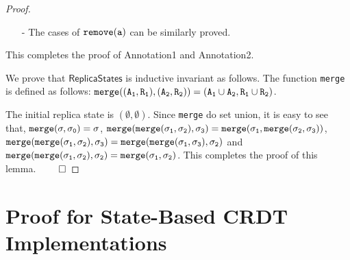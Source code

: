 \begin {proof}
\begin{itemize}
    \begin{itemize}
    \setlength{\itemsep}{0.5pt}
    \item[-] If $\alabel \in \alabelset_S$: Since the visibility relation is transitive, for each operation $\alabel'$, such that $(\alabel',\alabel) \in \avisord$, we can see that, $\alabel' \in \alabelset_S$. By Annotation1 of $\alabel$ and such $\alabel'$, and Annotation2 of $S$, we can see that, $A'' \subseteq A$ and $R'' \subseteq R$. Therefore, $A' = A$, $R' = R$, and we can see that Annotation2 holds for $S'$.

    \item[-] If $\alabel \notin \alabelset_S$: Let $\alabelset'_S$ be the $\alabelset$ of $S'$. We can see that, $\alabelset'_S = \alabelset_S \cup \alabel \cup \avisord^{-1}(\alabel)$. By Annotation1 of $(A'',R'')$ and Annotation2 of $S$, we can see that Annotation2 holds for $S'$.
    \end{itemize}

\item[-] The cases of $\alabelshort[{\tt remove}]{a}$ can be similarly proved.
\end{itemize}

This completes the proof of Annotation1 and Annotation2.

We prove that $\mathsf{ReplicaStates}$ is inductive invariant as follows. The function {\tt merge} is defined as follows: $\alabelshort[{\tt merge}]{(A_1,R_1),(A_2,R_2)} = (A_1 \cup A_2, R_1 \cup R_2)$.

The initial replica state is $(\emptyset,\emptyset)$. Since {\tt merge} do set union, it is easy to see that, $\alabelshort[{\tt merge}]{\astate,\astate_0} = \astate$, $\alabelshort[{\tt merge}]{\alabelshort[{\tt merge}]{\astate_1,\astate_2},\astate_3} = \alabelshort[{\tt merge}]{\astate_1, \alabelshort[{\tt merge}]{\astate_2,\astate_3}}$, $\alabelshort[{\tt merge}]{\alabelshort[{\tt merge}]{\astate_1,\astate_2},\astate_3} = \alabelshort[{\tt merge}]{\alabelshort[{\tt merge}]{\astate_1,\astate_3},\astate_2}$ and $\alabelshort[{\tt merge}]{\alabelshort[{\tt merge}]{\astate_1,\astate_2},\astate_2} = \alabelshort[{\tt merge}]{\astate_1,\astate_2}$. This completes the proof of this lemma. $\qed$
\end {proof}









\section{\crdtlin{} Proof for State-Based CRDT Implementations}
\label{sec:RA-linearizability proof for state-based CRDT implementations}

